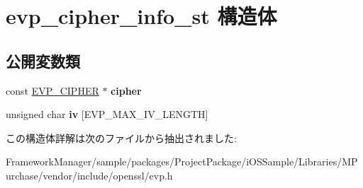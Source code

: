 \hypertarget{structevp__cipher__info__st}{}\section{evp\+\_\+cipher\+\_\+info\+\_\+st 構造体}
\label{structevp__cipher__info__st}
\subsection*{公開変数類}
\begin{DoxyCompactItemize}
\item 
\hypertarget{structevp__cipher__info__st_a54d5bc0202fbebadb925e7e87e7ee544}{}const \hyperlink{structevp__cipher__st}{E\+V\+P\+\_\+\+C\+I\+P\+H\+E\+R} $\ast$ {\bfseries cipher}\label{structevp__cipher__info__st_a54d5bc0202fbebadb925e7e87e7ee544}

\item 
\hypertarget{structevp__cipher__info__st_a579960a9fa646b1f82ecf67293c8a819}{}unsigned char {\bfseries iv} \mbox{[}E\+V\+P\+\_\+\+M\+A\+X\+\_\+\+I\+V\+\_\+\+L\+E\+N\+G\+T\+H\mbox{]}\label{structevp__cipher__info__st_a579960a9fa646b1f82ecf67293c8a819}

\end{DoxyCompactItemize}


この構造体詳解は次のファイルから抽出されました\+:\begin{DoxyCompactItemize}
\item 
Framework\+Manager/sample/packages/\+Project\+Package/i\+O\+S\+Sample/\+Libraries/\+M\+Purchase/vendor/include/openssl/evp.\+h\end{DoxyCompactItemize}
